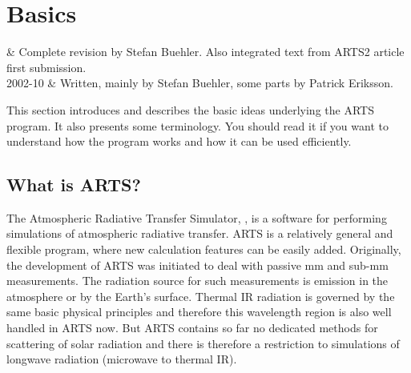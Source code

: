\chapter{Basics}
\label{sec:concept}

 & Complete revision by Stefan Buehler. Also integrated text
         from ARTS2 article first submission.\\
2002-10 & Written, mainly by Stefan Buehler, some parts by Patrick Eriksson. 
\stophistory

\graphicspath{{Figs/concept/}}


This section introduces and describes the basic ideas underlying the
ARTS program. It also presents some terminology. You should read
it if you want to understand how the program works and how it can be
used efficiently.



\section{What is ARTS?}

The Atmospheric Radiative Transfer Simulator, , is a
software for performing simulations of atmospheric radiative
transfer. ARTS is a relatively general and flexible program, where new
calculation features can be easily added. Originally, the development
of ARTS was initiated to deal with passive mm and sub-mm
measurements. The radiation source for such measurements is emission
in the atmosphere or by the Earth's surface. Thermal IR radiation is
governed by the same basic physical principles and therefore this
wavelength region is also well handled in ARTS now. But ARTS contains
so far no dedicated methods for scattering of solar radiation and
there is therefore a restriction to simulations of longwave radiation
(microwave to thermal IR).

